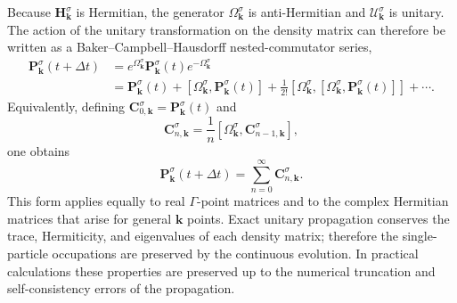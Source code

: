 Because $\mathbf H_{\mathbf k}^{\sigma}$ is Hermitian, the generator
$\Omega_{\mathbf k}^{\sigma}$ is anti-Hermitian and
$\mathcal U_{\mathbf k}^{\sigma}$ is unitary.  The action of the
unitary transformation on the density matrix can therefore be written as
a Baker--Campbell--Hausdorff nested-commutator series,
\begin{align}
  \mathbf P_{\mathbf k}^{\sigma}(t+\Delta t)
  &=
  e^{\Omega_{\mathbf k}^{\sigma}}
  \mathbf P_{\mathbf k}^{\sigma}(t)
  e^{-\Omega_{\mathbf k}^{\sigma}}
  \nonumber\\
  &=
  \mathbf P_{\mathbf k}^{\sigma}(t)
  +
  \left[
    \Omega_{\mathbf k}^{\sigma},
    \mathbf P_{\mathbf k}^{\sigma}(t)
  \right]
  +
  \frac{1}{2!}
  \left[
    \Omega_{\mathbf k}^{\sigma},
    \left[
      \Omega_{\mathbf k}^{\sigma},
      \mathbf P_{\mathbf k}^{\sigma}(t)
    \right]
  \right]
  + \cdots .
  \label{eq:bch_density_matrix_kspin}
\end{align}
Equivalently, defining
$\mathbf C_{0,\mathbf k}^{\sigma}=\mathbf P_{\mathbf k}^{\sigma}(t)$
and
\begin{equation}
  \mathbf C_{n,\mathbf k}^{\sigma}
  =
  \frac{1}{n}
  \left[
    \Omega_{\mathbf k}^{\sigma},
    \mathbf C_{n-1,\mathbf k}^{\sigma}
  \right],
  \label{eq:bch_recursive_terms}
\end{equation}
one obtains
\begin{equation}
  \mathbf P_{\mathbf k}^{\sigma}(t+\Delta t)
  =
  \sum_{n=0}^{\infty}
  \mathbf C_{n,\mathbf k}^{\sigma}.
  \label{eq:bch_recursive_sum}
\end{equation}
This form applies equally to real $\Gamma$-point matrices and to the
complex Hermitian matrices that arise for general $\mathbf k$ points.
Exact unitary propagation conserves the trace, Hermiticity, and
eigenvalues of each density matrix; therefore the single-particle
occupations are preserved by the continuous evolution.  In practical
calculations these properties are preserved up to the numerical
truncation and self-consistency errors of the propagation.

